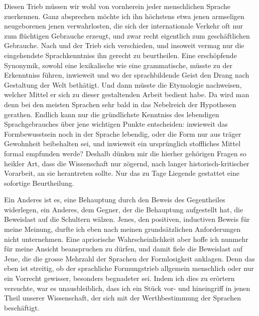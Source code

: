 Diesen Trieb müssen wir wohl von vornherein jeder menschlichen Sprache zuerkennen. Ganz absprechen möchte ich ihn höchstens etwa jenen armseligen neugeborenen  jenen verwahrlosten, die sich der internationale Verkehr oft nur zum flüchtigen Gebrauche erzeugt, und zwar \label{fp.216} recht eigentlich zum geschäftlichen Gebrauche. Nach  und  der Trieb sich verschieden, und insoweit vermag nur die eingehendste Sprachkenntniss ihn gerecht zu beurtheilen. Eine erschöpfende Synonymik, sowohl eine lexikalische wie eine grammatische, müsste zu der Erkenntniss führen, inwieweit und wo der sprachbildende Geist den Drang nach  Gestaltung der Welt bethätigt. Und dann müsste die Etymologie nachweisen, welcher Mittel er sich zu dieser gestaltenden Arbeit bedient habe. Da wird man denn bei den meisten Sprachen sehr bald in das Nebelreich der Hypothesen gerathen. Endlich kann nur die gründlichste Kenntniss des lebendigen Sprachgebrauches über jene wichtigen Punkte entscheiden: inwieweit das Formbewusstsein noch in der Sprache lebendig, oder die Form nur aus träger Gewohnheit beibehalten sei, und inwieweit ein ursprünglich stoffliches Mittel formal empfunden werde? Deshalb dünken mir die hierher gehörigen Fragen so heikler Art, dass die Wissenschaft nur zögernd, nach langer historisch-kritischer Vorarbeit, an sie herantreten sollte. Nur das zu Tage Liegende gestattet eine sofortige Beurtheilung.

Ein Anderes ist es, eine Behauptung durch den Beweis des Gegentheiles widerlegen, ein Anderes, dem Gegner, der die Behauptung aufgestellt hat, die Beweislast auf die Schultern wälzen. Jenes, den positiven, inductiven Beweis für meine Meinung, durfte ich eben nach \label{fp.348} meinen grundsätzlichen Anforderungen nicht unternehmen. Eine apriorische Wahrscheinlichkeit aber hoffe ich nunmehr für meine Ansicht beanspruchen zu dürfen, und damit fiele die Beweislast auf Jene, die die grosse Mehrzahl der Sprachen der Formlosigkeit anklagen. Denn das eben ist streitig, ob der sprachliche Formungstrieb allgemein menschlich \label{sp.365} oder nur ein Vorrecht gewisser, besonders begnadeter  sei. Indem ich dies zu erörtern versuchte, war es unausbleiblich, dass ich ein Stück vor- und hineingriff in jenen Theil unserer Wissenschaft, der sich mit der Werthbestimmung der Sprachen beschäftigt.

